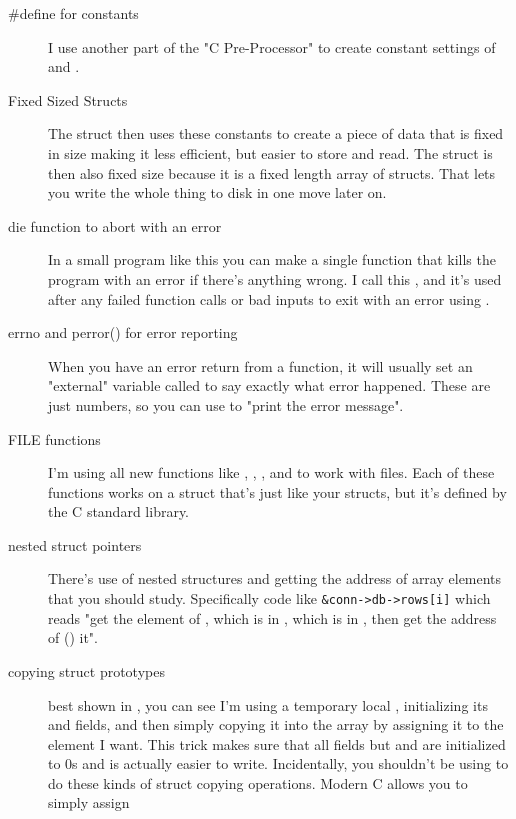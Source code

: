 \begin{description}
\item [\#define for constants] I use another part of the "C Pre-Processor" to
    create constant settings of  and .
\item [Fixed Sized Structs] The  struct then uses these
    constants to create a piece of data that is fixed in size making it
    less efficient, but easier to store and read.  The  struct
    is then also fixed size because it is a fixed length array of 
    structs.  That lets you write the whole thing to disk in one move later on.
\item [die function to abort with an error] In a small program like this you
    can make a single function that kills the program with an error if there's
    anything wrong.  I call this , and it's used after any failed
    function calls or bad inputs to exit with an error using .
\item [errno and perror() for error reporting] When you have an error return
    from a function, it will usually set an "external" variable called 
    to say exactly what error happened.  These are just numbers, so you can use
     to "print the error message".
\item [FILE functions] I'm using all new functions like , ,
    , and  to work with files.  Each of these functions
    works on a  struct that's just like your structs, but it's defined
    by the C standard library.
\item [nested struct pointers] There's use of nested structures and getting the
    address of array elements that you should study.  Specifically code like
    \verb|&conn->db->rows[i]| which reads "get the  element of , which is
    in , which is in , then get the address of (\ident{\&}) it".
\item [copying struct prototypes] best shown in , you can
    see I'm using a temporary local , initializing its 
    and  fields, and then simply copying it into the  array by
    assigning it to the element I want.  This trick makes sure that all fields
    but  and  are initialized to 0s and is actually 
    easier to write.  Incidentally, you shouldn't be using  to do
    these kinds of struct copying operations. Modern C allows you to simply assign

\end{description}
